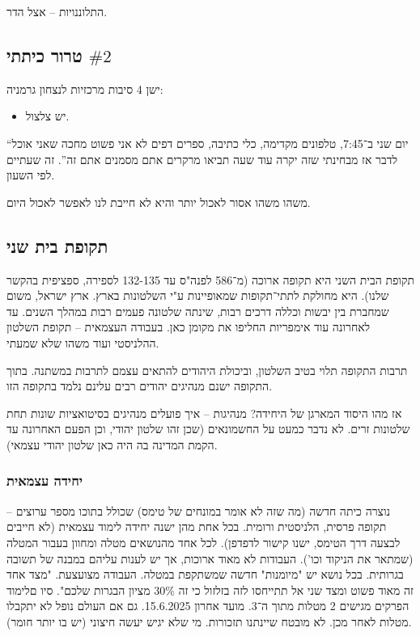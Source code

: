 \documentclass[a4paper]{book}
\begin{document}
	התלוננויות – אצל הדר. 
	
	\subsection{טרור כיתתי $\#2$}
	ישן 4 סיבות מרכזיות לנצחון גרמניה: 
	\begin{itemize}
		\item יש צלצול. 
	\end{itemize}
	
	``יום שני ב־7:45, טלפונים מקדימה, כלי כתיבה, ספרים דפים לא אני פשוט מחכה שאני אוכל לדבר אז מבחינתי שזה יקרה עוד שעה תביאו מרקרים אתם מסמנים אתם זה''. זה שעתיים לפי השעון. 
	
	    משהו משהו אסור לאכול יותר והיא לא חייבת לנו לאפשר לאכול היום. 
	
	
	\subsection{תקופת בית שני}
	תקופת הבית השני היא תקופה ארוכה (מ־586 לפנה"ס עד 132-135 לספירה, ספציפית בהקשר שלנו). היא מחולקת לתתי־תקופות שמאופיינות ע"י השלטונות בארץ. ארץ ישראל, משום שמחברת בין יבשות וכללה דרכים רבות, שינתה שלטונה פעמים רבות במהלך השנים. עד לאחרונה עוד אימפריות החליפו את מקומן כאן. בעבודה העצמאית – תקופת השלטון ההלניסטי ועוד משהו שלא שמעתי. 
	
	תרבות התקופה תלוי בטיב השלטון, וביכולת היהודים להתאים עצמם לתרבות במשתנה. בתוך התקופה ישנם מנהיגים יהודים רבים עלינם נלמד בתקופה הזו. 
	
	אז מהו היסוד המארגן של היחידה? מנהיגות – איך פועלים מנהיגים בסיטואציות שונות תחת שלטונות זרים. לא נדבר כמעט על החשמונאים (שכן זהו שלטון יהודי, וכן הפעם האחרונה עד הקמת המדינה בה היה כאן שלטון יהודי עצמאי). 
	
	\subsubsection{יחידה עצמאית}
	נוצרה כיתה חדשה (מה שזה לא אומר במונחים של טימס) שכולל בתוכו מספר ערוצים – תקופה פרסית, הלניסטית ורומית. בכל אחת מהן ישנה יחידה לימוד עצמאית (לא חייבים לבצעה דרך הטימס, ישנו קישור לדפדפן). לכל אחד מהנושאים מטלה ומחוון בעבור המטלה (שמתאר את הניקוד וכו'). העבודות לא מאוד ארוכות, אך יש לענות עליהם במבנה של תשובה בגרותית. בכל נושא יש "מיומנות" חדשה שמשתקפת במטלה. העבודה מצועצעת. "מצד אחד זה מאוד פשוט ומצד שני אל תתייחסו לזה בזלזול כי זה 30\% מציון הבגרות שלכם". סיו םלימוד הפרקים מגישים 2 מטלות מתוך ה־3. מועד אחרון 15.6.2025. גם אם העולם נופל לא יתקבלו מטלות לאחר מכן. לא מובטח שיינתנו תזכורות. מי שלא יגיש יעשה חיצוני (יש בו יותר חומר). 
	
\end{document}
